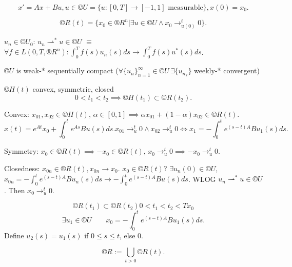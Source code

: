 \documentclass[12pt]{article}					%
\begin{document}
\begin{poznamka}
	$$ x' = Ax + Bu, u \in ©U = \{u: [0, T] \rightarrow [-1, 1] \text{ measurable}\}, x(0) = x_0. $$
\end{poznamka}

\begin{definice}
	$$ ©R(t) = \{x_0 \in ®R^n | \exists u \in ©U \land x_0 \rightarrow_{u(0)}^t 0\}. $$
\end{definice}

\begin{definice}
	$u_n \in ©U_0$: $u_n \rightharpoonup^* u \in ©U$ $≡$ $\forall f \in L(0, T, ®R^n): \int_0^T f(s) u_n(s) ds \rightarrow \int_0^T f(s) u^*(s) ds$.
\end{definice}

\begin{veta}[Alanglu]
	$©U$ is weak-* sequentially compact ($\forall \{u_n\}_{n=1}^∞ \in ©U\ \exists \{u_{n_k}\}$ weekly-* convergent)
\end{veta}

\begin{veta}
	$©H(t)$ convex, symmetric, closed
	$$ 0 < t_1 < t_2 \implies ©H(t_1) \subset ©R(t_2). $$

	\begin{dukazin}
		Convex: $x_{01}, x_{02} \in ©H(t)$, $\alpha \in [0, 1] \implies \alpha x_{01} + (1 - \alpha)x_{02} \in ©R(t)$.
		$$ x(t) = e^{At} x_0 + \int_0^t e^{As} B u(s) ds. x_{01} \rightarrow_u^t 0 \land x_{02} \rightarrow_u^t 0 \Leftrightarrow x_1 = -\int_0^t e^{(s - t)A} Bu_1(s) ds. $$
		
		Symmetry: $x_0 \in ©R(t) \implies -x_0 \in ©R(t)$, $x_0 \rightarrow_u^t 0 \implies -x_0 \rightarrow_u^t 0$.

		Closedness: $x_{0n} \in ®R(t), x_{0n} \rightarrow x_0$. $x_0 \in ©R(t)$? $\exists u_n(0) \in ©U$, $x_{0n} = - \int_0^t e^{(s - t)A} B u_n(s) ds \rightarrow - \int_0^t e^{(s - t)A} Bu(s) ds$.
		WLOG $u_n \rightharpoonup^* u \in ©U$. Then $x_0 \rightarrow_u^t 0$.

		$$ ©R(t_1) \subset ©R(t_2) 0 < t_1 < t_2 < Tx_0 $$
		$$ \exists u_1 \in ©U\qquad x_0 = -\int_0^t e^{(s - t)A} Bu_1(s) ds. $$
		Define $u_2(s) = u_1(s)$ if $0 ≤ s ≤ t$, else 0.
	\end{dukazin}
\end{veta}

\begin{definice}
	$$ ©R := \bigcup_{t > 0} ©R(t). $$
\end{definice}
\end{document}
